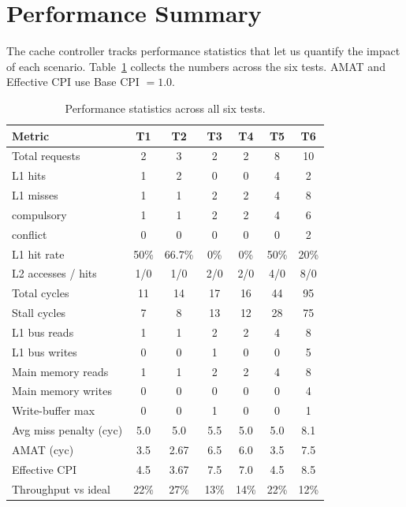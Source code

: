 \documentclass[11pt,a4paper]{article}
\begin{document}
\section{Performance Summary}\label{sec:perf}

The cache controller tracks performance statistics that let us quantify the
impact of each scenario. Table~\ref{tab:perf} collects the numbers across the
six tests. AMAT and Effective CPI use Base CPI $= 1.0$.

\begin{table}[h]
    \centering
    \caption{Performance statistics across all six tests.}
    \label{tab:perf}
    \small
    \begin{tabular}{@{}lcccccc@{}}
        \toprule
        \textbf{Metric} & \textbf{T1} & \textbf{T2} & \textbf{T3} & \textbf{T4} & \textbf{T5} & \textbf{T6} \\
        \midrule
        Total requests          & 2    & 3    & 2    & 2    & 8    & 10 \\
        L1 hits                 & 1    & 2    & 0    & 0    & 4    & 2 \\
        L1 misses               & 1    & 1    & 2    & 2    & 4    & 8 \\
        \quad compulsory        & 1    & 1    & 2    & 2    & 4    & 6 \\
        \quad conflict          & 0    & 0    & 0    & 0    & 0    & 2 \\
        L1 hit rate             & 50\% & 66.7\%& 0\% & 0\%  & 50\% & 20\% \\
        L2 accesses / hits      & 1/0  & 1/0  & 2/0  & 2/0  & 4/0  & 8/0  \\
        Total cycles            & 11   & 14   & 17   & 16   & 44   & 95 \\
        Stall cycles            & 7    & 8    & 13   & 12   & 28   & 75 \\
        L1 bus reads            & 1    & 1    & 2    & 2    & 4    & 8 \\
        L1 bus writes           & 0    & 0    & 1    & 0    & 0    & 5 \\
        Main memory reads       & 1    & 1    & 2    & 2    & 4    & 8 \\
        Main memory writes      & 0    & 0    & 0    & 0    & 0    & 4 \\
        Write-buffer max        & 0    & 0    & 1    & 0    & 0    & 1 \\
        Avg miss penalty (cyc)  & 5.0  & 5.0  & 5.5  & 5.0  & 5.0  & 8.1 \\
        AMAT (cyc)              & 3.5  & 2.67 & 6.5  & 6.0  & 3.5  & 7.5 \\
        Effective CPI           & 4.5  & 3.67 & 7.5  & 7.0  & 4.5  & 8.5 \\
        Throughput vs ideal     & 22\% & 27\% & 13\% & 14\% & 22\% & 12\% \\
        \bottomrule
    \end{tabular}
\end{table}
\end{document}
